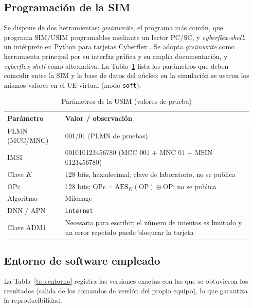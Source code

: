 \documentclass[conference]{IEEEtran}
\begin{document}
\subsection{Programación de la SIM}
Se dispone de dos herramientas: \textit{grsimwrite}, el programa más común, que programa SIM/USIM programables mediante un lector PC/SC, y \textit{cyberflex-shell}, un intérprete en Python para tarjetas Cyberflex \cite{grsim,cyberflex}. Se adopta \textit{grsimwrite} como herramienta principal por su interfaz gráfica y su amplia documentación, y \textit{cyberflex-shell} como alternativa. La Tabla~\ref{tab:sim} lista los parámetros que deben coincidir entre la SIM y la base de datos del núcleo; en la simulación se usaron los mismos valores en el UE virtual (modo \texttt{soft}).

\begin{table}[!t]
\caption{Parámetros de la USIM (valores de prueba)}
\label{tab:sim}
\centering
\footnotesize
\renewcommand{\arraystretch}{1.15}
\begin{tabular}{p{2.0cm}p{5.8cm}}
\toprule
\textbf{Parámetro} & \textbf{Valor / observación} \\
\midrule
PLMN (MCC/MNC) & 001/01 (PLMN de pruebas) \\
IMSI & 001010123456780 (MCC 001 + MNC 01 + MSIN 0123456780) \\
Clave $K$ & 128 bits, hexadecimal; clave de laboratorio, no se publica \\
OPc & 128 bits; $\mathrm{OPc}=\mathrm{AES}_K(\mathrm{OP})\oplus\mathrm{OP}$; no se publica \\
Algoritmo & Milenage \\
DNN / APN & \texttt{internet} \\
Clave ADM1 & Necesaria para escribir; el número de intentos es limitado y un error repetido puede bloquear la tarjeta \\
\bottomrule
\end{tabular}
\end{table}

\subsection{Entorno de software empleado}
La Tabla~\ref{tab:entorno} registra las versiones exactas con las que se obtuvieron los resultados (salida de los comandos de versión del propio equipo), lo que garantiza la reproducibilidad.
\end{document}
